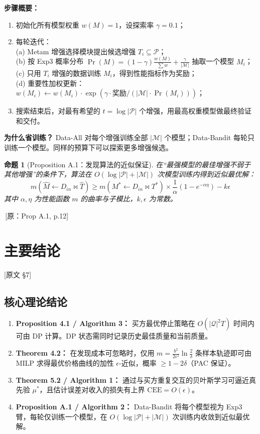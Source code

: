 \documentclass[12pt,a4paper]{article}
\newcommand{\srcref}[1]{\textcolor{black!65}{\footnotesize\,[原：#1]}}
\newcommand{\secref}[1]{\hspace{0.6em} \textcolor{black!80}{\footnotesize [原文 #1]}}
\newtheorem{proposition}[theorem]{命题}
\theoremstyle{definition}
\begin{document}
\textbf{步骤概要：}
\begin{enumerate}[leftmargin=*,nosep]
    \item 初始化所有模型权重 $w(M)=1$，设探索率 $\gamma=0.1$；
    \item 每轮迭代：\\
    (a) Metam 增强选择模块提出候选增强 $T_i \subseteq \mathcal{P}$；\\
    (b) 按 Exp3 概率分布 $\Pr(M) = (1-\gamma)\frac{w(M)}{\sum w} + \frac{\gamma}{|\mathcal{M}|}$ 抽取一个模型 $M_i$；\\
    (c) 只用 $T_i$ 增强的数据训练 $M_i$，得到性能指标作为奖励；\\
    (d) 重要性加权更新：$w(M_i) \leftarrow w(M_i) \cdot \exp(\gamma \cdot \text{奖励} / (|\mathcal{M}| \cdot \Pr(M_i)))$；
    \item 搜索结束后，对最有希望的 $t = \log|\mathcal{P}|$ 个增强，用最高权重模型做最终验证和交付。
\end{enumerate}

\textbf{为什么省训练？} Data-All 对每个增强训练全部 $|\mathcal{M}|$ 个模型；Data-Bandit 每轮只训练一个模型。同样的预算下可以探索更多增强候选。

\begin{proposition}[Proposition A.1：发现算法的近似保证]
在``最强模型的最佳增强不弱于其他增强''的条件下，算法在 $O(\log|\mathcal{P}| + |\mathcal{M}|)$ 次模型训练内得到近似最优解：
\[
m(\widehat{M} \leftarrow D_{in} \Join \widehat{T}) \ge m(M^* \leftarrow D_{in} \Join T^*) \times \frac{1}{\alpha}(1-e^{-\alpha\eta}) - k\epsilon
\]
其中 $\alpha,\eta$ 为性能函数 $m$ 的曲率与子模比，$k,\epsilon$ 为常数。
\end{proposition}
\srcref{Prop A.1, p.12}

\section{主要结论}
\secref{§7}

\subsection{核心理论结论}

\begin{enumerate}[label=(\arabic*),leftmargin=*]
    \item \textbf{Proposition 4.1 / Algorithm 3：} 买方最优停止策略在 $O(|\mathcal{Q}|^2 T)$ 时间内可由 DP 计算。DP 状态需同时记录历史最佳质量和当前质量。
    \item \textbf{Theorem 4.2：} 在发现成本可忽略时，仅用 $m = \frac{b^2}{2\epsilon^2}\ln\frac{2}{\delta}$ 条样本轨迹即可由 MILP 求得最优价格曲线的加性 $\epsilon$-近似，概率 $\ge 1-2\delta$（PAC 保证）。
    \item \textbf{Theorem 5.2 / Algorithm 1：} 通过与买方重复交互的贝叶斯学习可逼近真先验 $\mu^*$，且估计误差对收入的损失有上界 $\mathrm{CEE}=O(\epsilon)$。
    \item \textbf{Proposition A.1 / Algorithm 2：} Data-Bandit 将每个模型视为 Exp3 臂，每轮仅训练一个模型，在 $O(\log|\mathcal{P}|+|\mathcal{M}|)$ 次训练内收敛到近似最优解。
\end{enumerate}
\end{document}
